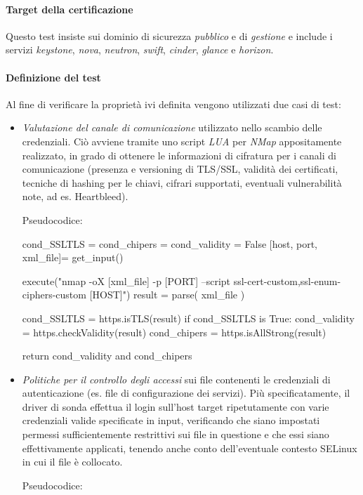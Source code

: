 \documentclass[../main.tex]{subfiles}
\begin{document}
\paragraph{Target della certificazione}
Questo test insiste sui dominio di sicurezza \textit{pubblico} e di \textit{gestione} e include i servizi \textit{keystone}, \textit{nova}, \textit{neutron}, \textit{swift}, \textit{cinder}, \textit{glance} e \textit{horizon}. 
\paragraph{Definizione del test}
Al fine di verificare la proprietà ivi definita vengono utilizzati due casi di test:
\begin{itemize}
\item \textit{Valutazione del canale di comunicazione} utilizzato nello scambio delle credenziali. Ciò avviene tramite uno script \textit{LUA} per \textit{NMap} appositamente realizzato, in grado di ottenere le informazioni di cifratura per i canali di comunicazione (presenza e versioning di TLS/SSL, validità dei certificati, tecniche di hashing per le chiavi, cifrari supportati, eventuali vulnerabilità note, ad es. Heartbleed).

Pseudocodice:

\begin{python}
cond_SSLTLS = cond_chipers = cond_validity = False
[host, port, xml_file]= get_input()

execute("nmap -oX [xml_file] -p [PORT] --script ssl-cert-custom,ssl-enum-ciphers-custom [HOST]")
result = parse( xml_file )

cond_SSLTLS = https.isTLS(result)
if cond_SSLTLS is True:
    cond_validity = https.checkValidity(result)
    cond_chipers = https.isAllStrong(result)

return cond_validity and cond_chipers
\end{python}

\item \textit{Politiche per il controllo degli accessi} sui file contenenti le credenziali di autenticazione (es. file di configurazione dei servizi). 
Più specificatamente, il driver di sonda effettua il login sull'host target ripetutamente con varie credenziali valide specificate in input, verificando che siano impostati permessi sufficientemente restrittivi sui file in questione e che essi siano effettivamente applicati, tenendo anche conto dell'eventuale contesto SELinux in cui il file è collocato.

Pseudocodice:


\end{itemize}
\end{document}
